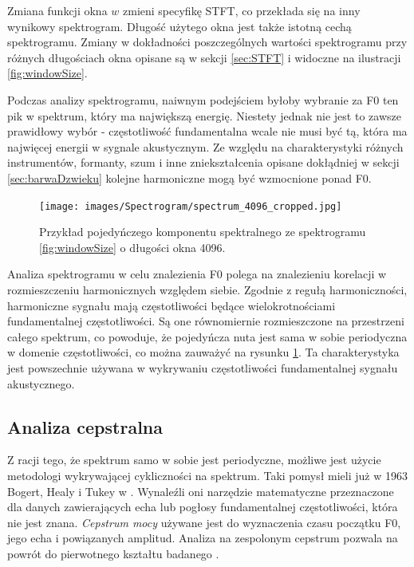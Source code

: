 \documentclass[12pt,a4paper,twoside]{mwart}
\begin{document}
Zmiana funkcji okna $w$ zmieni specyfikę STFT, co przekłada się na inny wynikowy spektrogram. Długość użytego okna jest także istotną cechą spektrogramu. Zmiany w dokładności poszczególnych wartości spektrogramu przy różnych długościach okna opisane są w sekcji \ref{sec:STFT} i widoczne na ilustracji \ref{fig:windowSize}.

Podczas analizy spektrogramu, naiwnym podejściem byłoby wybranie za F0 ten pik w spektrum, który ma największą energię. Niestety jednak nie jest to zawsze prawidłowy wybór - częstotliwość fundamentalna wcale nie musi być tą, która ma najwięcej energii w sygnale akustycznym. Ze względu na charakterystyki różnych instrumentów, formanty, szum i inne zniekształcenia opisane dokłądniej w sekcji \ref{sec:barwaDzwieku} kolejne harmoniczne mogą być wzmocnione ponad F0.

\begin{figure}[t]
  \begin{center}
    \texttt{[image: images/Spectrogram/spectrum\_4096\_cropped.jpg]}
    \caption{Przykład pojedyńczego komponentu spektralnego ze spektrogramu \ref{fig:windowSize} o długości okna 4096.}
    \label{fig:spectralComponent}
  \end{center}
\end{figure}

Analiza spektrogramu w celu znalezienia F0 polega na znalezieniu korelacji w rozmieszczeniu harmonicznych względem siebie. Zgodnie z regułą harmoniczności, harmoniczne sygnału mają częstotliwości będące wielokrotnościami fundamentalnej częstotliwości. Są one równomiernie rozmieszczone na przestrzeni całego spektrum, co powoduje, że pojedyńcza nuta jest sama w sobie periodyczna w domenie częstotliwości, co można zauważyć na rysunku \ref{fig:spectralComponent}. Ta charakterystyka jest powszechnie używana w wykrywaniu częstotliwości fundamentalnej sygnału akustycznego.

\subsection{Analiza cepstralna}\label{sec:f0:ceps}
Z racji tego, że spektrum samo w sobie jest periodyczne, możliwe jest użycie metodologi wykrywającej cykliczności na spektrum. Taki pomysł mieli już w 1963 Bogert, Healy i Tukey w \cite{Transcription:Bogert:FirstCepstrum}. Wynaleźli oni narzędzie matematyczne przeznaczone dla danych zawierających echa lub pogłosy fundamentalnej częstotliwości, która nie jest znana. \textit{Cepstrum mocy} używane jest do wyznaczenia czasu początku F0, jego echa i powiązanych amplitud. Analiza na zespolonym cepstrum pozwala na powrót do pierwotnego kształtu badanego \cite{Transcription:Childers:CepstruGuide} \cite[46-59]{Transcription:Quenneville:Thesis}.
\end{document}

